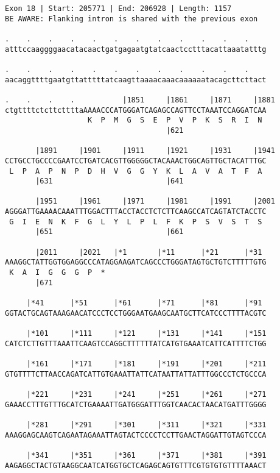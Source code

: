 \documentclass{article}
\begin{document}
\begin{Verbatim}
Exon 18 | Start: 205771 | End: 206928 | Length: 1157
BE AWARE: Flanking intron is shared with the previous exon
 
.    .    .    .    .    .    .    .    .    .    .    .    
atttccaaggggaacatacaactgatgagaatgtatcaactcctttacattaaatatttg
  
.    .    .    .    .    .    .    .    .    .    .    .    
aacaggttttgaatgttatttttatcaagttaaaacaaacaaaaaatacagcttcttact
  
.    .    .    .           |1851     |1861     |1871     |1881
ctgttttctcttcttttaAAAACCCATGGGATCAGAGCCAGTTCCTAAATCCAGGATCAA
                   K  P  M  G  S  E  P  V  P  K  S  R  I  N 
                                     |621                   
  
       |1891     |1901     |1911     |1921     |1931     |1941
CCTGCCTGCCCCGAATCCTGATCACGTTGGGGGCTACAAACTGGCAGTTGCTACATTTGC
 L  P  A  P  N  P  D  H  V  G  G  Y  K  L  A  V  A  T  F  A 
       |631                          |641                   
  
       |1951     |1961     |1971     |1981     |1991     |2001
AGGGATTGAAAACAAATTTGGACTTTACCTACCTCTCTTCAAGCCATCAGTATCTACCTC
 G  I  E  N  K  F  G  L  Y  L  P  L  F  K  P  S  V  S  T  S 
       |651                          |661                   
  
       |2011     |2021   |*1       |*11      |*21      |*31 
AAAGGCTATTGGTGGAGGCCCATAGGAAGATCAGCCCTGGGATAGTGCTGTCTTTTTGTG
 K  A  I  G  G  G  P  *   
       |671                                                 
  
     |*41      |*51      |*61      |*71      |*81      |*91 
GGTACTGCAGTAAAGAACATCCCTCCTGGGAATGAAGCAATGCTTCATCCCTTTTACGTC
  
     |*101     |*111     |*121     |*131     |*141     |*151
CATCTCTTGTTTAAATTCAAGTCCAGGCTTTTTTATCATGTGAAATCATTCATTTTCTGG
  
     |*161     |*171     |*181     |*191     |*201     |*211
GTGTTTTCTTAACCAGATCATTGTGAAATTATTCATAATTATTATTTGGCCCTCTGCCCA
  
     |*221     |*231     |*241     |*251     |*261     |*271
GAAACCTTTGTTTGCATCTGAAAATTGATGGGATTTGGTCAACACTAACATGATTTGGGG
  
     |*281     |*291     |*301     |*311     |*321     |*331
AAAGGAGCAAGTCAGAATAGAAATTAGTACTCCCCTCCTTGAACTAGGATTGTAGTCCCA
  
     |*341     |*351     |*361     |*371     |*381     |*391
AAGAGGCTACTGTAAGGCAATCATGGTGCTCAGAGCAGTGTTTCGTGTGTGTTTTAAACT
  

\end{Verbatim}
\end{document}

